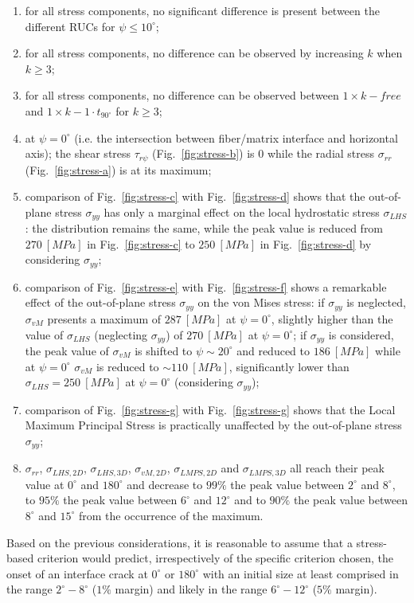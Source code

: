 \documentclass[12pt,a4paper]{article}
\begin{document}
\begin{enumerate}
\itemsep-0.5pt
\item for all stress components, no significant difference is present between the different RUCs for $\psi\leq10^{\circ}$;
\item for all stress components, no difference can be observed by increasing $k$ when $k\geq3$;
\item for all stress components, no difference can be observed between $1\times  k-free$ and $1\times  k-1\cdot t_{90^{\circ}}$ for $k\geq3$;
\item at $\psi=0^{\circ}$ (i.e. the intersection between fiber/matrix interface and horizontal axis); the shear stress $\tau_{r\psi}$ (Fig.~\ref{fig:stress-b}) is $0$ while the radial stress $\sigma_{rr}$ (Fig.~\ref{fig:stress-a}) is at its maximum;
\item comparison of Fig.~\ref{fig:stress-c} with Fig.~\ref{fig:stress-d} shows that the out-of-plane stress $\sigma_{yy}$ has only a marginal effect on the local hydrostatic stress $\sigma_{LHS}$: the distribution remains the same, while the peak value is reduced from $270\ \left[MPa\right]$ in Fig.~\ref{fig:stress-c} to $250\ \left[MPa\right]$ in Fig.~\ref{fig:stress-d} by considering $\sigma_{yy}$;
\item comparison of Fig.~\ref{fig:stress-e} with Fig.~\ref{fig:stress-f} shows a remarkable effect of the out-of-plane stress $\sigma_{yy}$ on the von Mises stress: if $\sigma_{yy}$ is neglected, $\sigma_{vM}$ presents a maximum of $287\ \left[MPa\right]$ at $\psi=0^{\circ}$, slightly higher than the value of $\sigma_{LHS}$ (neglecting $\sigma_{yy}$) of $270\ \left[MPa\right]$ at $\psi=0^{\circ}$; if $\sigma_{yy}$ is considered, the peak value of $\sigma_{vM}$ is shifted to $\psi\sim20^{\circ}$ and reduced to $186\ \left[MPa\right]$ while at $\psi=0^{\circ}$ $\sigma_{vM}$ is reduced to $\sim110\ \left[MPa\right]$, significantly lower than $\sigma_{LHS}=250\ \left[MPa\right]$ at $\psi=0^{\circ}$ (considering $\sigma_{yy}$);
\item comparison of Fig.~\ref{fig:stress-g} with Fig.~\ref{fig:stress-g} shows that the Local Maximum Principal Stress is practically unaffected by the out-of-plane stress $\sigma_{yy}$;
\item $\sigma_{rr}$, $\sigma_{LHS,2D}$, $\sigma_{LHS,3D}$, $\sigma_{vM,2D}$, $\sigma_{LMPS,2D}$ and $\sigma_{LMPS,3D}$ all reach their peak value at $0^{\circ}$ and $180^{\circ}$ and decrease to $99\%$ the peak value between $2^{\circ}$ and $8^{\circ}$, to $95\%$ the peak value between $6^{\circ}$ and $12^{\circ}$ and to $90\%$ the peak value between $8^{\circ}$ and $15^{\circ}$ from the occurrence of the maximum.
\end{enumerate}
\vspace{-5pt}
Based on the previous considerations, it is reasonable to assume that a stress-based criterion would predict, irrespectively of the specific criterion chosen, the onset of an interface crack at $0^{\circ}$ or $180^{\circ}$ with an initial size at least comprised in the range $2^{\circ}-8^{\circ}$ ($1\%$ margin) and likely in the range $6^{\circ}-12^{\circ}$ ($5\%$ margin).
\end{document}
